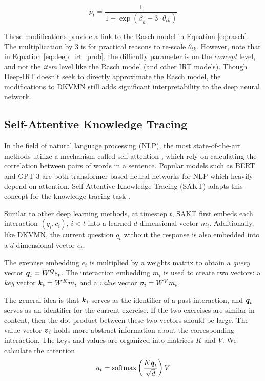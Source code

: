 \begin{equation}
  p_t = \frac{1}{1 + \exp\left( \beta_k - 3\cdot \theta_{tk} \right)}
  \label{eq:deep_irt_prob}
\end{equation}

These modifications provide a link to the Rasch model in Equation \ref{eq:rasch}. The multiplication by 3 is for practical reasons to re-scale $\theta_{tk}$. However, note that in Equation \ref{eq:deep_irt_prob}, the difficulty parameter is on the \textit{concept} level, and not the \textit{item} level like the Rasch model (and other IRT models). Though Deep-IRT doesn't seek to directly approximate the Rasch model, the modifications to DKVMN still adds significant interpretability to the deep neural network.


\subsection{Self-Attentive Knowledge Tracing}\label{sec:sakt}
In the field of natural language processing (NLP), the most state-of-the-art methods utilize a mechanism called self-attention \cite{vaswani2017}, which rely on calculating the correlation between pairs of words in a sentence. Popular models such as BERT \cite{bert} and GPT-3 \cite{gpt3} are both transformer-based neural networks for NLP which heavily depend on attention. Self-Attentive Knowledge Tracing (SAKT) adapts this concept for the knowledge tracing task \cite{pandey2019}. 

Similar to other deep learning methods, at timestep $t$, SAKT first embeds each interaction $(q_i, c_i)$, $i<t$ into a learned $d$-dimensional vector $m_i$. Additionally, like DKVMN, the current question $q_t$ without the response is also embedded into a $d$-dimensional vector $e_t$. 

The exercise embedding $e_t$ is multiplied by a weights matrix to obtain a \textit{query} vector $\boldsymbol{q}_t = W^{Q}e_t$. The interaction embedding $m_i$ is used to create two vectors: a \textit{key} vector $\boldsymbol{k}_i = W^{K}m_i$ and a \textit{value} vector $\boldsymbol{v}_i = W^V m_i$. 

The general idea is that $\boldsymbol{k}_i$ serves as the identifier of a past interaction, and $\boldsymbol{q}_t$ serves as an identifier for the current exercise. If the two exercises are similar in content, then the dot product between these two vectors should be large. The value vector $\boldsymbol{v}_i$ holds more abstract information about the corresponding interaction. The keys and values are organized into matrices $K$ and $V$. We calculate the attention
\begin{equation}
  a_{t} = \text{softmax}\left(\frac{K \boldsymbol{q}_t}{\sqrt{d}} \right) V
  \label{eq:attn}
\end{equation}

